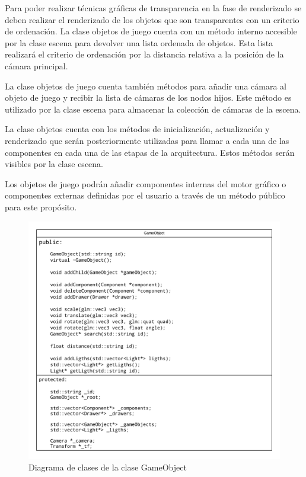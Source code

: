 \documentclass[a4paper, 17pt]{book}
\begin{document}
\vspace{1mm} %

Para poder realizar técnicas gráficas de transparencia en la fase de renderizado se deben realizar el renderizado de los objetos
que son transparentes con un criterio de ordenación. La clase objetos de juego cuenta con un método interno accesible por la clase
escena para devolver una lista ordenada de objetos. Esta lista realizará el criterio de ordenación por la distancia relativa a la
posición de la cámara principal.

\vspace{1mm} %

La clase objetos de juego cuenta también métodos para añadir una cámara al objeto de juego y recibir la lista de cámaras de los
nodos hijos. Este método es utilizado por la clase escena para almacenar la colección de cámaras de la escena.

\vspace{1mm} %

La clase objetos cuenta con los métodos de inicialización, actualización y renderizado que serán posteriormente utilizadas para
llamar a cada una de las componentes en cada una de las etapas de la arquitectura. Estos métodos serán visibles por la clase escena.

\vspace{1mm} %

Los objetos de juego podrán añadir componentes internas del motor gráfico o componentes externas definidas por el usuario a través
de un método público para este propósito.

\begin{figure}[H]
    \centering
    \includegraphics[scale=0.4, keepaspectratio]{img/GameObject.png}
    \caption{Diagrama de clases de la clase GameObject}
    \label{figura:GameObject}
\end{figure}
\end{document}

